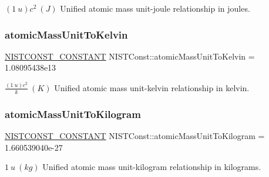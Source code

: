 $(1\ u)c^2 \ (J)$ Unified atomic mass unit-\/joule relationship in joules. \mbox{\label{group___n_i_s_t_const-_atomic_mass_unit_ga74d5a7e0d6f6182731b839a578353769}} 
\subsubsection{\texorpdfstring{atomic\+Mass\+Unit\+To\+Kelvin}{atomicMassUnitToKelvin}}
{\footnotesize\ttfamily \mbox{\hyperlink{group___n_i_s_t_const-_macros_ga2b0fc1d7452373f816175dd86ce26729}{N\+I\+S\+T\+C\+O\+N\+S\+T\+\_\+\+C\+O\+N\+S\+T\+A\+NT}} N\+I\+S\+T\+Const\+::atomic\+Mass\+Unit\+To\+Kelvin = 1.\+08095438e13}

$\frac{(1\ u)c^2}{k} \ (K)$ Unified atomic mass unit-\/kelvin relationship in kelvin. \mbox{\label{group___n_i_s_t_const-_atomic_mass_unit_ga72ba2b08855b26ea2477c3e8104bbc16}} 
\subsubsection{\texorpdfstring{atomic\+Mass\+Unit\+To\+Kilogram}{atomicMassUnitToKilogram}}
{\footnotesize\ttfamily \mbox{\hyperlink{group___n_i_s_t_const-_macros_ga2b0fc1d7452373f816175dd86ce26729}{N\+I\+S\+T\+C\+O\+N\+S\+T\+\_\+\+C\+O\+N\+S\+T\+A\+NT}} N\+I\+S\+T\+Const\+::atomic\+Mass\+Unit\+To\+Kilogram = 1.\+660539040e-\/27}

$1\ u\ (kg)$ Unified atomic mass unit-\/kilogram relationship in kilograms. 